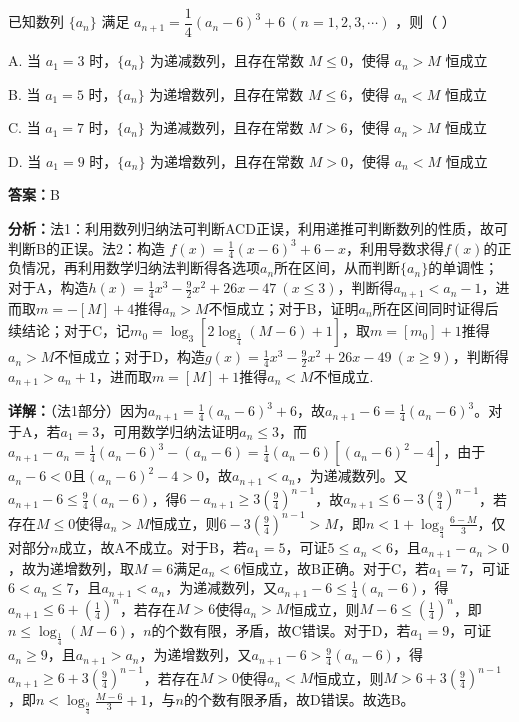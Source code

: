 \begin{question}[points=4]
已知数列 $\{a_n\}$ 满足 $a_{n+1} = \dfrac{1}{4}(a_n - 6)^3 + 6\ (n = 1,2,3,\cdots)$ ，则（ ）
\begin{choices}
  \item A. 当 $a_1 = 3$ 时，$\{a_n\}$ 为递减数列，且存在常数 $M \le 0$，使得 $a_n > M$ 恒成立
  \item B. 当 $a_1 = 5$ 时，$\{a_n\}$ 为递增数列，且存在常数 $M \le 6$，使得 $a_n < M$ 恒成立
  \item C. 当 $a_1 = 7$ 时，$\{a_n\}$ 为递减数列，且存在常数 $M > 6$，使得 $a_n > M$ 恒成立
  \item D. 当 $a_1 = 9$ 时，$\{a_n\}$ 为递增数列，且存在常数 $M > 0$，使得 $a_n < M$ 恒成立
\end{choices}
\begin{solution}
\textbf{答案：}B

\textbf{分析：}法1：利用数列归纳法可判断ACD正误，利用递推可判断数列的性质，故可判断B的正误。法2：构造 $f(x)=\frac{1}{4}(x-6)^3+6-x$，利用导数求得$f(x)$的正负情况，再利用数学归纳法判断得各选项$a_n$所在区间，从而判断$\{a_n\}$的单调性；对于A，构造$h(x)=\frac{1}{4}x^3-\frac{9}{2}x^2+26x-47\ (x\le 3)$，判断得$a_{n+1}<a_n-1$，进而取$m=-[M]+4$推得$a_n>M$不恒成立；对于B，证明$a_n$所在区间同时证得后续结论；对于C，记$m_0=\log_3[2\log_{\frac{1}{4}}(M-6)+1]$，取$m=[m_0]+1$推得$a_n>M$不恒成立；对于D，构造$g(x)=\frac{1}{4}x^3-\frac{9}{2}x^2+26x-49\ (x\ge 9)$，判断得$a_{n+1}>a_n+1$，进而取$m=[M]+1$推得$a_n<M$不恒成立.

\textbf{详解：}（法1部分）因为$a_{n+1}=\frac{1}{4}(a_n-6)^3+6$，故$a_{n+1}-6=\frac{1}{4}(a_n-6)^3$。对于A，若$a_1=3$，可用数学归纳法证明$a_n\le 3$，而$a_{n+1}-a_n=\frac{1}{4}(a_n-6)^3-(a_n-6)=\frac{1}{4}(a_n-6)[(a_n-6)^2-4]$，由于$a_n-6<0$且$(a_n-6)^2-4>0$，故$a_{n+1}<a_n$，为递减数列。又$a_{n+1}-6\le \frac{9}{4}(a_n-6)$，得$6-a_{n+1}\ge 3(\frac{9}{4})^{n-1}$，故$a_{n+1}\le 6-3(\frac{9}{4})^{n-1}$，若存在$M\le 0$使得$a_n>M$恒成立，则$6-3(\frac{9}{4})^{n-1}>M$，即$n<1+\log_{\frac{9}{4}}\frac{6-M}{3}$，仅对部分$n$成立，故A不成立。对于B，若$a_1=5$，可证$5\le a_n<6$，且$a_{n+1}-a_n>0$，故为递增数列，取$M=6$满足$a_n<6$恒成立，故B正确。对于C，若$a_1=7$，可证$6<a_n\le 7$，且$a_{n+1}<a_n$，为递减数列，又$a_{n+1}-6\le \frac{1}{4}(a_n-6)$，得$a_{n+1}\le 6+(\frac{1}{4})^n$，若存在$M>6$使得$a_n>M$恒成立，则$M-6\le (\frac{1}{4})^n$，即$n\le \log_{\frac{1}{4}}(M-6)$，$n$的个数有限，矛盾，故C错误。对于D，若$a_1=9$，可证$a_n\ge 9$，且$a_{n+1}>a_n$，为递增数列，又$a_{n+1}-6>\frac{9}{4}(a_n-6)$，得$a_{n+1}\ge 6+3(\frac{9}{4})^{n-1}$，若存在$M>0$使得$a_n<M$恒成立，则$M>6+3(\frac{9}{4})^{n-1}$，即$n<\log_{\frac{9}{4}}\frac{M-6}{3}+1$，与$n$的个数有限矛盾，故D错误。故选B。
\end{solution}
\end{question}

